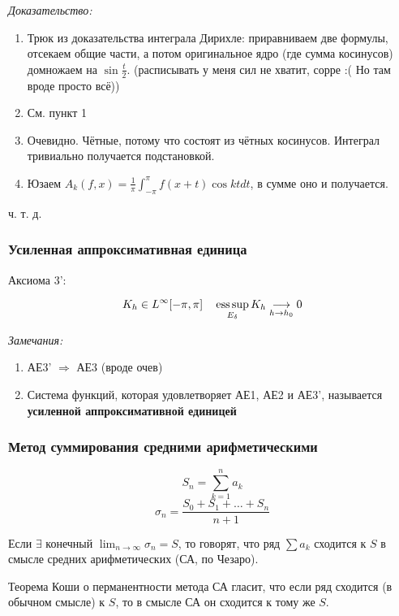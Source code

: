 \documentclass{article}
\def\goesto#1{\underset{#1}{\longrightarrow}}
\begin{document}
\textit{Доказательство:}

\begin{enumerate}
    \item Трюк из доказательства интеграла Дирихле: приравниваем две формулы, отсекаем общие части, а потом оригинальное ядро (где сумма косинусов) домножаем на $\sin \frac{t}{2}$. (расписывать у меня сил не хватит, сорре :( Но там вроде просто всё))
    \item См. пункт 1
    \item Очевидно. Чётные, потому что состоят из чётных косинусов. Интеграл тривиально получается подстановкой.
    \item Юзаем $A_k(f, x) = \frac{1}{\pi} \int_{-\pi}^{\pi} f(x + t) \cos kt dt$, в сумме оно и получается.
\end{enumerate}

ч. т. д. 

\subsubsection{Усиленная аппроксимативная единица}

Аксиома 3':

\[K_h \in L^{\infty}[-\pi, \pi] \quad \esssup_{E_\delta} K_h \goesto{h \rightarrow h_0} 0\]

\textit{Замечания: }

\begin{enumerate}
    \item АЕ3' $\Rightarrow$ АЕ3 (вроде очев)
    \item Система функций, которая удовлетворяет АЕ1, АЕ2 и АЕ3', называется \textbf{усиленной аппроксимативной единицей}
\end{enumerate}

\subsubsection{Метод суммирования средними арифметическими}

\[S_n = \sum_{k = 1}^{n} a_k\]
\[\sigma_n = \frac{S_0 + S_1 + \ldots + S_n}{n + 1}\]

Если $\exists$ конечный $\lim_{n \rightarrow \infty} \sigma_n = S$, то говорят, что ряд $\sum a_k$ сходится к $S$ в смысле средних арифметических (СА, по Чезаро).

Теорема Коши о перманентности метода СА гласит, что если ряд сходится (в обычном смысле) к $S$, то в смысле СА он сходится к тому же $S$.
\end{document}
